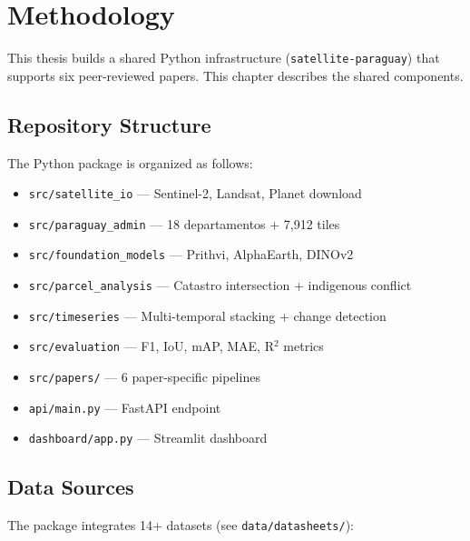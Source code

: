 
\chapter{Methodology}

This thesis builds a shared Python infrastructure (\texttt{satellite-paraguay})
that supports six peer-reviewed papers. This chapter describes the shared
components.

\section{Repository Structure}

The Python package is organized as follows:

\begin{itemize}
    \item \texttt{src/satellite\_io} — Sentinel-2, Landsat, Planet download
    \item \texttt{src/paraguay\_admin} — 18 departamentos + 7,912 tiles
    \item \texttt{src/foundation\_models} — Prithvi, AlphaEarth, DINOv2
    \item \texttt{src/parcel\_analysis} — Catastro intersection + indigenous conflict
    \item \texttt{src/timeseries} — Multi-temporal stacking + change detection
    \item \texttt{src/evaluation} — F1, IoU, mAP, MAE, R$^2$ metrics
    \item \texttt{src/papers/} — 6 paper-specific pipelines
    \item \texttt{api/main.py} — FastAPI endpoint
    \item \texttt{dashboard/app.py} — Streamlit dashboard
\end{itemize}

\section{Data Sources}

The package integrates 14+ datasets (see \texttt{data/datasheets/}):


